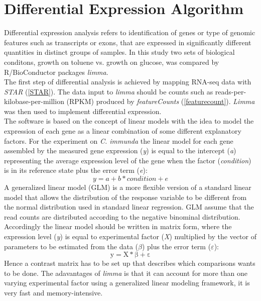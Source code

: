 \documentclass[12pt, a4paper]{report}
\begin{document}
\section{Differential Expression Algorithm}
Differential expression analysis refers to identification of genes or type of genomic features such as transcripts or exons, that are expressed in significantly different quantities in distinct groups of samples. In this study two sets of biological conditons, growth on toluene vs. growth on glucose, was compared by R/BioConductor packages \textit{limma}.\\
The first step of differential analysis is achieved by mapping RNA-seq data with \textit{STAR} (\ref{STAR}). The data input to \textit{limma} should be counts such as reads-per-kilobase-per-million (RPKM) produced by \textit{featureCounts} (\ref{featurecount}). \textit{Limma} was then used to implement differential expression. \\
The software is based on the concept of linear models with the idea to model the expression of each gene as a linear combination of some different explanatory factors. For the experiment on \textit{C. immunda} the linear model for each gene assembled by the measured gene expression (\textit{y}) is equal to the intercept (\textit{a}) representing the average expression level of the gene when the factor (\textit{condition}) is in its reference state plus the error term (\textit{e}): 
\[y = a + b * condition + e\]
A generalized linear model (GLM) is a more flexible version of a standard linear model that allows the distribution of the response variable to be different from the normal distribution used in standard linear regression. GLM assume that the read counts are distributed according to the negative binominal distribution. 
Accordingly the linear model should be written in matrix form, where the expression level (\textit{y}) is equal to experimental factor (\textit{X}) multiplied by the vector of parameters to be estimated from the data ($\beta$) plus the error term ($\varepsilon$):
\[ \mathrm{ y = X * \beta + \varepsilon}\]
Hence a contrast matrix has to be set up that describes which comparisons wants to be done. The adavantages of \textit{limma} is that it can account for more than one varying experimental factor using a generalized linear modeling framework, it is very fast and memory-intensive. \cite{Ritchie2015}
\end{document}
